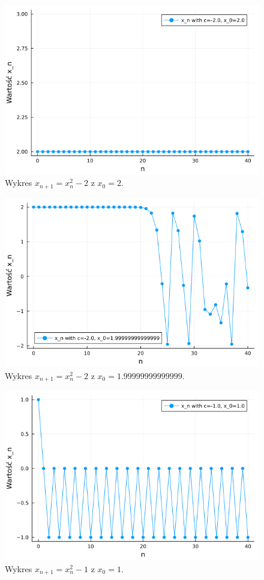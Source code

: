 \documentclass{article}
\begin{document}
\begin{figure}[H]
\centering
\includegraphics[width=\textwidth]{plot_1_2.png}
\caption{Wykres $x_{n + 1} = x_n^2 - 2$ z $x_0 = 2$.}
\end{figure}


\begin{figure}[H]
\centering
\includegraphics[width=\textwidth]{plot_1_3.png}
\caption{Wykres $x_{n + 1} = x_n^2 - 2$ z $x_0 = 1.99999999999999$.}
\end{figure}


\begin{figure}[H]
\centering
\includegraphics[width=\textwidth]{plot_2_1.png}
\caption{Wykres $x_{n + 1} = x_n^2 - 1$ z $x_0 = 1$.}
\end{figure}
\end{document}
